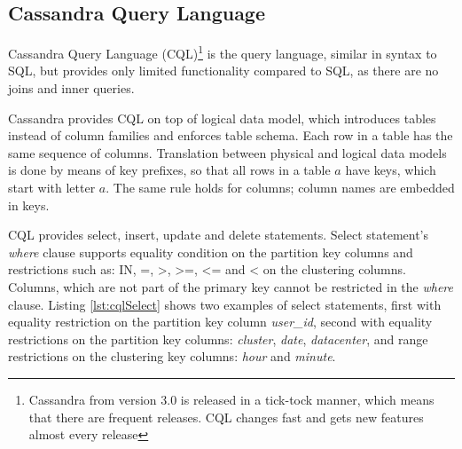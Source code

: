 





\subsection{Cassandra Query Language}
\label{sec:theory:cassandra:cql}
Cassandra Query Language (CQL)\footnote{Cassandra from version 3.0 is released in a tick-tock manner, which means that there are frequent releases. CQL changes fast and gets new features almost every release} is the query language, similar in syntax to SQL, but provides only limited functionality compared to SQL, as there are no joins and inner queries. 

Cassandra provides CQL on top of logical data model, which introduces tables instead of column families and enforces table schema. Each row in a table has the same sequence of columns. Translation between physical and logical data models is done by means of key prefixes, so that all rows in a table $a$ have keys, which start with letter $a$. The same rule holds for columns; column names are embedded in keys.

CQL provides select, insert, update and delete statements. Select statement's \emph{where} clause supports equality condition on the partition key columns and restrictions such as: IN, =, >, >=, <= and < on the clustering columns. Columns, which are not part of the primary key cannot be restricted in the \emph{where} clause. Listing \ref{lst:cqlSelect} shows two examples of select statements, first with equality restriction on the partition key column \emph{user_id}, second with equality restrictions on the partition key columns: \emph{cluster}, \emph{date}, \emph{datacenter}, and range restrictions on the clustering key columns: \emph{hour} and \emph{minute}.

